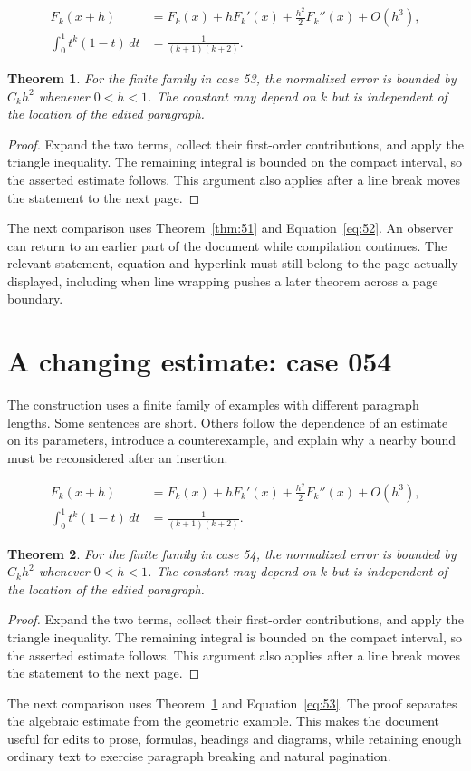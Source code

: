 \documentclass[a4paper,10pt]{article}
\newtheorem{theorem}{Theorem}[section]
\begin{document}
\lipsum[7-8]
\begin{align}\label{eq:52}
 F_k(x+h)&=F_k(x)+hF_k'(x)+\frac{h^2}{2}F_k''(x)+O(h^3),\\
 \int_0^1 t^k(1-t)\,dt&=\frac{1}{(k+1)(k+2)}.
\end{align}
\begin{theorem}\label{thm:52}
For the finite family in case 53, the normalized error is bounded by $C_k h^2$ whenever $0<h<1$. The constant may depend on $k$ but is independent of the location of the edited paragraph.
\end{theorem}
\begin{proof}
Expand the two terms, collect their first-order contributions, and apply the
triangle inequality. The remaining integral is bounded on the compact interval,
so the asserted estimate follows. This argument also applies after a line break
moves the statement to the next page.
\end{proof}
The next comparison uses Theorem~\ref{thm:51} and Equation~\ref{eq:52}. An observer can return to an earlier part of the document while compilation continues. The relevant statement, equation and hyperlink must still belong to the page actually displayed, including when line wrapping pushes a later theorem across a page boundary.

\lipsum[13]

\section{A changing estimate: case 054}\label{unit:53}
The construction uses a finite family of examples with different paragraph lengths. Some sentences are short. Others follow the dependence of an estimate on its parameters, introduce a counterexample, and explain why a nearby bound must be reconsidered after an insertion.

\lipsum[10-11]
\begin{align}\label{eq:53}
 F_k(x+h)&=F_k(x)+hF_k'(x)+\frac{h^2}{2}F_k''(x)+O(h^3),\\
 \int_0^1 t^k(1-t)\,dt&=\frac{1}{(k+1)(k+2)}.
\end{align}
\begin{theorem}\label{thm:53}
For the finite family in case 54, the normalized error is bounded by $C_k h^2$ whenever $0<h<1$. The constant may depend on $k$ but is independent of the location of the edited paragraph.
\end{theorem}
\begin{proof}
Expand the two terms, collect their first-order contributions, and apply the
triangle inequality. The remaining integral is bounded on the compact interval,
so the asserted estimate follows. This argument also applies after a line break
moves the statement to the next page.
\end{proof}
The next comparison uses Theorem~\ref{thm:52} and Equation~\ref{eq:53}. The proof separates the algebraic estimate from the geometric example. This makes the document useful for edits to prose, formulas, headings and diagrams, while retaining enough ordinary text to exercise paragraph breaking and natural pagination.
\end{document}

